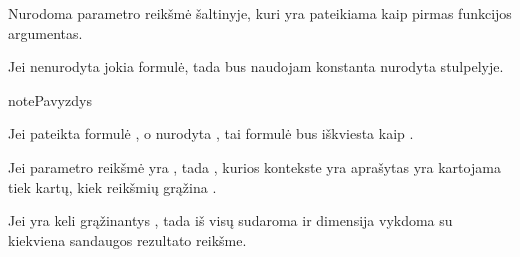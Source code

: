 \documentclass[letterpaper,10pt,lithuanian]{sphinxmanual}
\begin{document}

\begin{fulllineitems}
\label{\detokenize{dimensijos:param.source}}
\pysigstartsignatures
{}
\pysigstopsignatures
\sphinxAtStartPar
Nurodoma parametro reikšmė šaltinyje, kuri yra pateikiama kaip pirmas
{\hyperref[\detokenize{dimensijos:module-param.prepare}]{}} funkcijos argumentas.

\sphinxAtStartPar
Jei {\hyperref[\detokenize{dimensijos:module-param.prepare}]{}} nenurodyta jokia formulė, tada bus naudojam
konstanta nurodyta {\hyperref[\detokenize{dimensijos:param.source}]{}} stulpelyje.

\begin{sphinxadmonition}{note}{Pavyzdys}

\sphinxAtStartPar
Jei {\hyperref[\detokenize{dimensijos:module-param.prepare}]{}} pateikta formulė , o
{\hyperref[\detokenize{dimensijos:param.source}]{}} nurodyta , tai formulė bus iškviesta kaip
.
\end{sphinxadmonition}

\end{fulllineitems}


\sphinxAtStartPar
Jei parametro reikšmė yra {\hyperref[\detokenize{savokos:term-iteratorius}]{}}, tada {\hyperref[\detokenize{savokos:term-dimensija}]{}}, kurios
kontekste yra aprašytas {\hyperref[\detokenize{dimensijos:param}]{}} yra kartojama tiek kartų,
kiek reikšmių grąžina {\hyperref[\detokenize{savokos:term-iteratorius}]{}}.

\sphinxAtStartPar
Jei yra keli {\hyperref[\detokenize{dimensijos:param}]{}} grąžinantys {\hyperref[\detokenize{savokos:term-iteratorius}]{}}, tada iš
visų {\hyperref[\detokenize{savokos:term-iteratorius}]{}} sudaroma  ir
{\hyperref[\detokenize{formatas:resource}]{}} dimensija vykdoma su kiekviena sandaugos rezultato reikšme.
\end{document}
